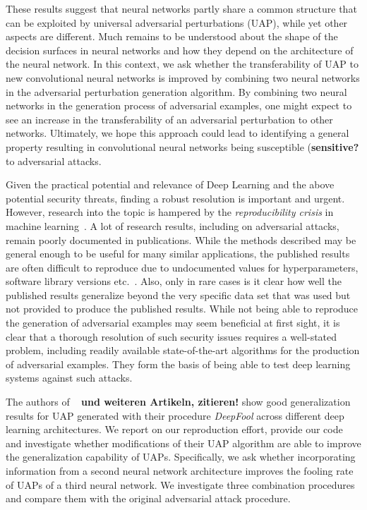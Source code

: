 \documentclass[runningheads]{llncs}
\begin{document}
These results suggest that neural networks partly share a common structure that can be exploited by universal adversarial perturbations (UAP), while yet other aspects are different. Much remains to be understood about the shape of the decision surfaces in neural networks and how they depend on the architecture of the neural network. In this context, we ask whether the transferability of UAP to new convolutional neural networks is improved by combining two neural networks in the adversarial perturbation generation algorithm. By combining two neural networks in the generation process of adversarial examples, one might expect to see an increase in the transferability of an adversarial perturbation to other networks. Ultimately, we hope this approach could lead to identifying a general property resulting in convolutional neural networks being susceptible ({\bf sensitive?} to adversarial attacks.

Given the practical potential and relevance of Deep Learning and the above potential security threats, finding a robust resolution is important and urgent. However, research into the topic is hampered by the \emph{reproducibility crisis} in machine learning~\cite{raff2020quantifying}. A lot of research results, including on adversarial attacks, remain poorly documented in publications. While the methods described may be general enough to be useful for many similar applications, 
the published results are often difficult to reproduce due to undocumented values for hyperparameters, software library versions etc.~\cite{Gundersen2018StateOT}.%
Also, only in rare cases is it clear how well the published results generalize beyond the very specific data set that was used but not provided to produce the published results. While not being able to reproduce the generation of adversarial examples may seem beneficial at first sight, it is clear that a thorough resolution of such security issues requires a well-stated problem, including readily available state-of-the-art algorithms for the production of adversarial examples. They form the basis of being able to test deep learning systems against such attacks. 

The authors of ~\cite{moosavi-dezfooli_universal_2017} {\bf und weiteren Artikeln, zitieren!} show good generalization results for UAP generated with their procedure \emph{DeepFool}\cite{DeepFool-Moosavi-Dezfooli15} across different deep learning architectures. We report on our reproduction effort, provide our code and investigate whether modifications of their UAP algorithm are able to improve the generalization capability of UAPs. Specifically, we ask whether incorporating information from a second neural network architecture improves the fooling rate of UAPs of a third neural network. We investigate three combination procedures and compare them with the original adversarial attack procedure.
\end{document}
